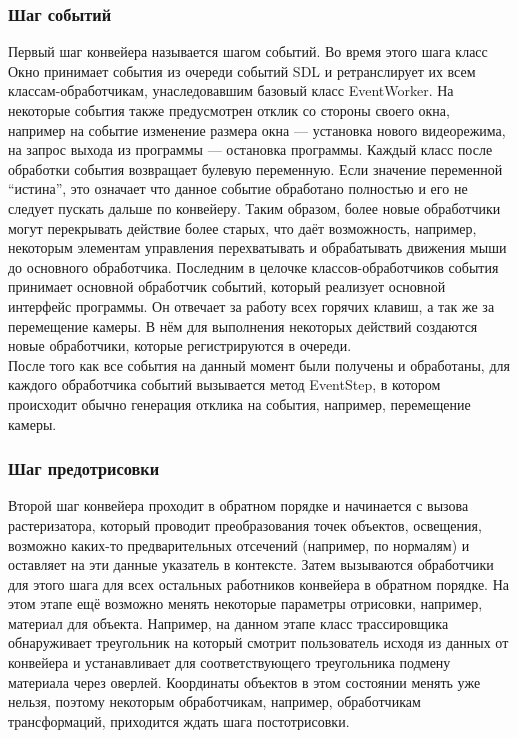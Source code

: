 \documentclass[a4paper,12pt]{report}
\numberwithin{equation}{section}
\begin{document}
\subsubsection{Шаг событий}
Первый шаг конвейера называется шагом событий. Во время этого шага класс Окно принимает события из очереди событий SDL и ретранслирует их всем классам-обработчикам, унаследовавшим базовый класс EventWorker. На некоторые события также предусмотрен отклик со стороны своего окна, например на событие изменение размера окна --- установка нового видеорежима, на запрос выхода из программы --- остановка программы. Каждый класс после обработки события возвращает булевую переменную. Если значение переменной ``истина'', это означает что данное событие обработано полностью и его не следует пускать дальше по конвейеру. Таким образом, более новые обработчики могут перекрывать действие более старых, что даёт возможность, например, некоторым элементам управления перехватывать и обрабатывать движения мыши до основного обработчика. Последним в целочке классов-обработчиков события принимает основной обработчик событий, который реализует основной интерфейс программы. Он отвечает за работу всех горячих клавиш, а так же за перемещение камеры. В нём для выполнения некоторых действий создаются новые обработчики, которые регистрируются в очереди. \\
После того как все события на данный момент были получены и обработаны, для каждого обработчика событий вызывается метод EventStep, в котором происходит обычно генерация отклика на события, например, перемещение камеры.

\subsubsection{Шаг предотрисовки}
Второй шаг конвейера проходит в обратном порядке и начинается с вызова растеризатора, который проводит преобразования точек объектов, освещения, возможно каких-то предварительных отсечений (например, по нормалям) и оставляет на эти данные указатель в контексте. Затем вызываются обработчики для этого шага для всех остальных работников конвейера в обратном порядке. На этом этапе ещё возможно менять некоторые параметры отрисовки, например, материал для объекта. Например, на данном этапе класс трассировщика обнаруживает треугольник на который смотрит пользователь исходя из данных от конвейера и устанавливает для соответствующего треугольника подмену материала через оверлей. Координаты объектов в этом состоянии менять уже нельзя, поэтому некоторым обработчикам, например, обработчикам трансформаций, приходится ждать шага постотрисовки.
\end{document}
